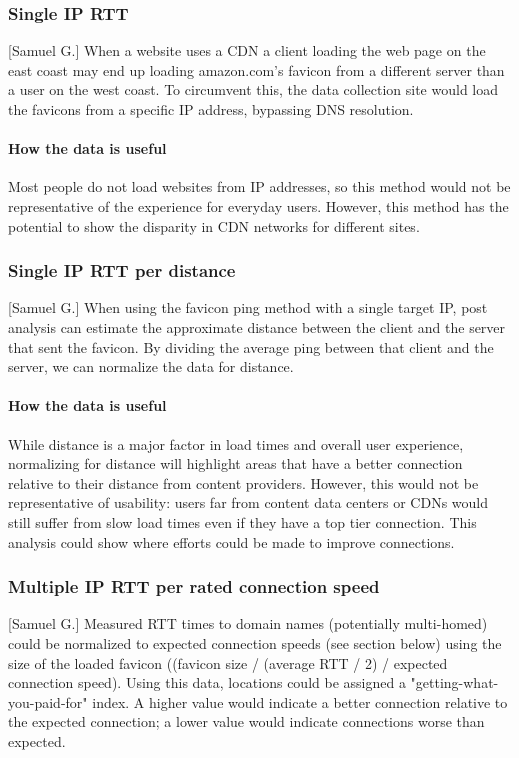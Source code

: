 \documentclass[12pt]{article}
\begin{document}
\subsubsection{Single IP RTT}[Samuel G.]
When a website uses a CDN a client loading the web page on the east coast may end up loading amazon.com's favicon from a different server than a user on the west coast. To circumvent this, the data collection site would load the favicons from a specific IP address, bypassing DNS resolution.

\paragraph{How the data is useful}
Most people do not load websites from IP addresses, so this method would not be representative of the experience for everyday users. However, this method has the potential to show the disparity in CDN networks for different sites.

\subsubsection{Single IP RTT per distance}[Samuel G.]
When using the favicon ping method with a single target IP, post analysis can estimate the approximate distance between the client and the server that sent the favicon. By dividing the average ping between that client and the server, we can normalize the data for distance.
\paragraph{How the data is useful}
While distance is a major factor in load times and overall user experience, normalizing for distance will highlight areas that have a better connection relative to their distance from content providers. However, this would not be representative of usability: users far from content data centers or CDNs would still suffer from slow load times even if they have a top tier connection. This analysis could show where efforts could be made to improve connections.

\subsubsection{Multiple IP RTT per rated connection speed}[Samuel G.]
Measured RTT times to domain names (potentially multi-homed) could be normalized to expected connection speeds (see section below) using the size of the loaded favicon ((favicon size / (average RTT / 2) / expected connection speed). Using this data, locations could be assigned a "getting-what-you-paid-for" index. A higher value would indicate a better connection relative to the expected connection; a lower value would indicate connections worse than expected.
\end{document}
